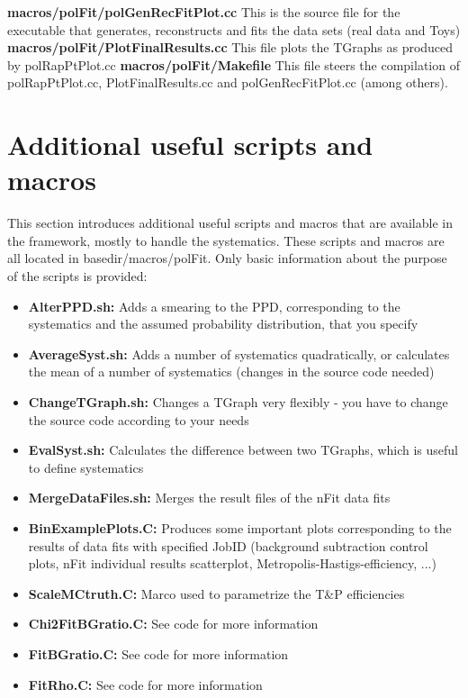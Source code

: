 \documentclass{article}
\begin{document}
\newline
\newline
{\bf macros/polFit/polGenRecFitPlot.cc}
This is the source file for the executable that generates, reconstructs and fits the data sets (real data and Toys)
\newline
\newline
{\bf macros/polFit/PlotFinalResults.cc}
This file plots the TGraphs as produced by polRapPtPlot.cc
\newline
\newline
{\bf macros/polFit/Makefile}
This file steers the compilation of polRapPtPlot.cc, PlotFinalResults.cc and polGenRecFitPlot.cc (among others).
\newline
\newline

\section{Additional useful scripts and macros}
\label{sec:additional_scripts}

This section introduces additional useful scripts and macros that are available in the framework, mostly to handle the systematics. These scripts and macros are all located in basedir/macros/polFit. Only basic information about the purpose of the scripts is provided:
\begin{itemize}
\item {\bf AlterPPD.sh:} Adds a smearing to the PPD, corresponding to the systematics and the assumed probability distribution, that you specify
\item {\bf AverageSyst.sh:} Adds a number of systematics quadratically, or calculates the mean of a number of systematics (changes in the source code needed)
\item {\bf ChangeTGraph.sh:} Changes a TGraph very flexibly - you have to change the source code according to your needs
\item {\bf EvalSyst.sh:} Calculates the difference between two TGraphs, which is useful to define systematics
\item {\bf MergeDataFiles.sh:} Merges the result files of the nFit data fits
\item {\bf BinExamplePlots.C:} Produces some important plots corresponding to the results of data fits with specified JobID (background subtraction control plots, nFit individual results scatterplot, Metropolis-Hastigs-efficiency, ...)
\item {\bf ScaleMCtruth.C:} Marco used to parametrize the T\&P efficiencies
\item {\bf Chi2FitBGratio.C:} See code for more information 
\item {\bf FitBGratio.C:} See code for more information 
\item {\bf FitRho.C:} See code for more information 
\end{itemize}
\end{document}
